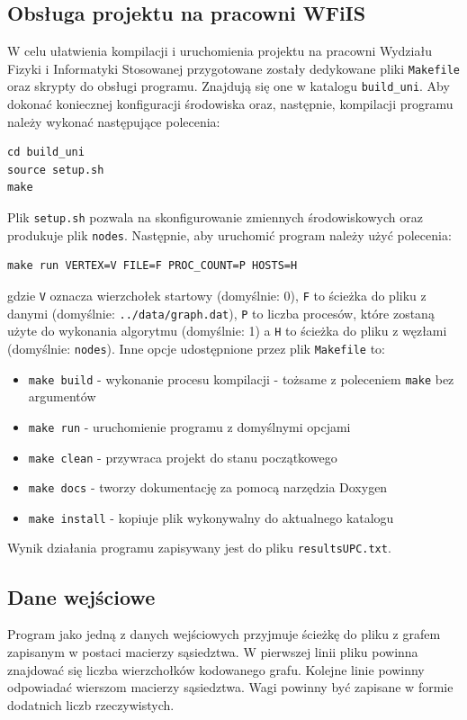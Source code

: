 \documentclass[12pt]{article}
\begin{document}
\subsection{Obsługa projektu na pracowni WFiIS}
\label{sec:doxy}
W celu ułatwienia kompilacji i uruchomienia projektu na pracowni Wydziału Fizyki i Informatyki Stosowanej przygotowane zostały dedykowane pliki \lstinline{Makefile} oraz skrypty do obsługi programu. Znajdują się one w katalogu \lstinline{build_uni}. Aby dokonać koniecznej konfiguracji środowiska oraz, następnie, kompilacji programu należy wykonać następujące polecenia:
\begin{lstlisting}
cd build_uni
source setup.sh
make
\end{lstlisting}
Plik \lstinline{setup.sh} pozwala na skonfigurowanie zmiennych środowiskowych oraz produkuje plik \lstinline{nodes}. Następnie, aby uruchomić program należy użyć polecenia:
\begin{lstlisting}
make run VERTEX=V FILE=F PROC_COUNT=P HOSTS=H
\end{lstlisting}
gdzie \lstinline{V} oznacza wierzchołek startowy (domyślnie: 0), \lstinline{F} to ścieżka do pliku z danymi (domyślnie: \lstinline{../data/graph.dat}), \lstinline{P} to liczba procesów, które zostaną użyte do wykonania algorytmu (domyślnie: 1) a \lstinline{H} to ścieżka do pliku z węzłami (domyślnie: \lstinline{nodes}). Inne opcje udostępnione przez plik \lstinline{Makefile} to:
\begin{itemize}
\item \lstinline{make build} - wykonanie procesu kompilacji - tożsame z poleceniem \lstinline{make} bez argumentów
\item \lstinline{make run} - uruchomienie programu z domyślnymi opcjami
\item \lstinline{make clean} - przywraca projekt do stanu początkowego
\item \lstinline{make docs} - tworzy dokumentację za pomocą narzędzia Doxygen
\item \lstinline{make install} - kopiuje plik wykonywalny do aktualnego katalogu
\end{itemize}
Wynik działania programu zapisywany jest do pliku \lstinline{resultsUPC.txt}.

\subsection{Dane wejściowe}
Program jako jedną z danych wejściowych przyjmuje ścieżkę do pliku z grafem zapisanym w postaci macierzy sąsiedztwa. W pierwszej linii pliku powinna znajdować się liczba wierzchołków kodowanego grafu. Kolejne linie powinny odpowiadać wierszom macierzy sąsiedztwa. Wagi powinny być zapisane w formie dodatnich liczb rzeczywistych.
\end{document}
